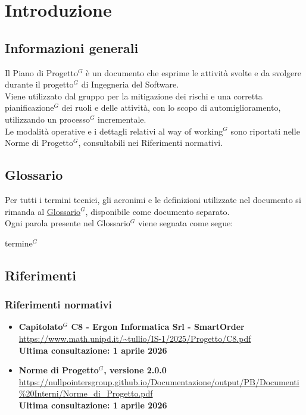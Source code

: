 \section{Introduzione}
	\subsection{Informazioni generali}
	Il Piano di Progetto$^G$ è un documento che esprime le attività svolte e da svolgere durante il progetto$^G$ di Ingegneria del Software. \\
	Viene utilizzato dal gruppo per la mitigazione dei rischi e una corretta pianificazione$^G$ dei ruoli e delle attività, con lo scopo di automiglioramento, utilizzando un processo$^G$ incrementale.\\
	Le modalità operative e i dettagli relativi al way of working$^G$ sono riportati nelle Norme di Progetto$^G$, consultabili nei Riferimenti normativi.
	
	\subsection{Glossario}
	Per tutti i termini tecnici, gli acronimi e le definizioni utilizzate nel documento si rimanda al \underline{\href{https://nullpointersgroup.github.io/Documentazione/output/PB/Documenti\%20Interni/Glossario.pdf}{Glossario$^G$}}, disponibile come documento separato.\\
	Ogni parola presente nel Glossario$^G$ viene segnata come segue:
	\begin{center}
		termine$^{G}$
	\end{center}
	
	\subsection{Riferimenti}
	\subsubsection{Riferimenti normativi}
	\begin{itemize}[itemsep=5pt, parsep=5pt, label=$\scriptstyle\bullet$]
	
	\item \textbf{Capitolato$^G$ C8 - Ergon Informatica Srl - SmartOrder}\\
	\url{https://www.math.unipd.it/~tullio/IS-1/2025/Progetto/C8.pdf}\\[3pt]
	\textbf{Ultima consultazione: 1 aprile 2026}
	
	\item \textbf{Norme di Progetto$^G$, versione 2.0.0}\\
	\url{https://nullpointersgroup.github.io/Documentazione/output/PB/Documenti%20Interni/Norme_di_Progetto.pdf}\\[3pt]
	\textbf{Ultima consultazione: 1 aprile 2026}
	\end{itemize}

